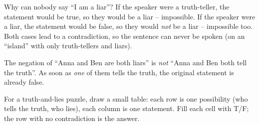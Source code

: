 \begin{proofbox}
Why can nobody say ``I am a liar''? If the speaker were a truth-teller, the statement would be true, so they would be a liar --
impossible. If the speaker were a liar, the statement would be false, so they would \emph{not} be a liar -- impossible too. Both
cases lead to a contradiction, so the sentence can never be spoken (on an ``island'' with only truth-tellers and liars).
\end{proofbox}
\begin{warnbox}
The negation of ``Anna and Ben are both liars'' is \emph{not} ``Anna and Ben both tell the truth''. As soon as \emph{one} of them tells
the truth, the original statement is already false.
\end{warnbox}
\begin{tipbox}
For a truth-and-lies puzzle, draw a small table: each row is one possibility (who tells the truth, who lies), each column is one
statement. Fill each cell with T/F; the row with no contradiction is the answer.
\end{tipbox}

